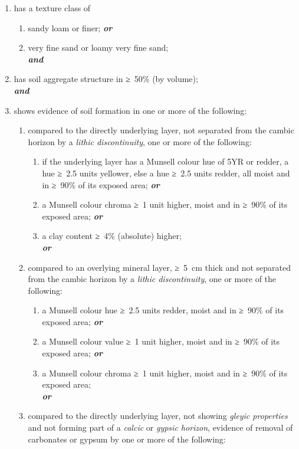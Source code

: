 \documentclass[
  letterpaper,
  DIV=11,
  numbers=noendperiod]{scrreprt}
\providecommand{\tightlist}{%
  \setlength{\itemsep}{0pt}\setlength{\parskip}{0pt}}\usepackage{longtable,booktabs,array}
\begin{document}
\begin{enumerate}
\def\labelenumi{\arabic{enumi}.}
\item
  has a texture class of

  \begin{enumerate}
  \def\labelenumii{\alph{enumii}.}
  \tightlist
  \item
    sandy loam or finer; \textbf{\emph{or}}
  \item
    very fine sand or loamy very fine sand;\\
    \textbf{\emph{and}}
  \end{enumerate}
\item
  has soil aggregate structure in ≥~50\% (by volume);\\
  \textbf{\emph{and}}
\item
  shows evidence of soil formation in one or more of the following:

  \begin{enumerate}
  \def\labelenumii{\alph{enumii}.}
  \item
    compared to the directly underlying layer, not separated from the
    cambic horizon by a \emph{lithic discontinuity}, one or more of the
    following:

    \begin{enumerate}
    \def\labelenumiii{\roman{enumiii}.}
    \tightlist
    \item
      if the underlying layer has a Munsell colour hue of 5YR or redder,
      a hue ≥~2.5 units yellower, else a hue ≥~2.5 units redder, all
      moist and in ≥~90\% of its exposed area; \textbf{\emph{or}}
    \item
      a Munsell colour chroma ≥~1 unit higher, moist and in ≥~90\% of
      its exposed area; \textbf{\emph{or}}
    \item
      a clay content ≥~4\% (absolute) higher;\\
      \textbf{\emph{or}}
    \end{enumerate}
  \item
    compared to an overlying mineral layer, ≥~5~cm thick and not
    separated from the cambic horizon by a \emph{lithic discontinuity},
    one or more of the following:

    \begin{enumerate}
    \def\labelenumiii{\roman{enumiii}.}
    \tightlist
    \item
      a Munsell colour hue ≥~2.5 units redder, moist and in ≥~90\% of
      its exposed area; \textbf{\emph{or}}
    \item
      a Munsell colour value ≥~1 unit higher, moist and in ≥~90\% of its
      exposed area; \textbf{\emph{or}}
    \item
      a Munsell colour chroma ≥~1 unit higher, moist and in ≥~90\% of
      its exposed area;\\
      \textbf{\emph{or}}
    \end{enumerate}
  \item
    compared to the directly underlying layer, not showing \emph{gleyic
    properties} and not forming part of a \emph{calcic} or \emph{gypsic
    horizon}, evidence of removal of carbonates or gypsum by one or more
    of the following:


\end{enumerate}
\end{enumerate}
\end{document}
